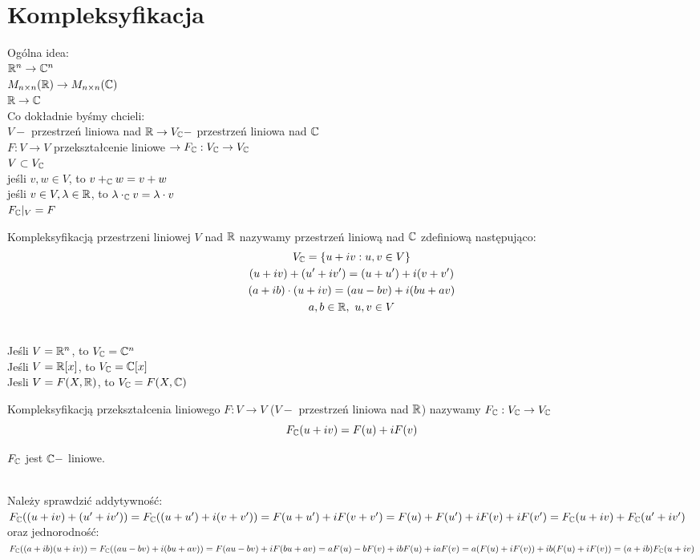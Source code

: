 \section{Kompleksyfikacja} 
Ogólna idea: \\[0.25cm]
$\mathbb{R}^n \to \mathbb{C}^n$ \\ 
$M_{n \times n}(\mathbb{R}) \to M_{n \times n}(\mathbb{C})$\\ 
$\mathbb{R} \to \mathbb{C}$ \\[0.5cm] 
Co dokładnie byśmy chcieli:\\[0.25cm]
$V - $ przestrzeń liniowa nad $\mathbb{R} \to V_{\mathbb{C}} - $ przestrzeń liniowa nad $\mathbb{C}$ \\ 
$F: V \to V $ przekształcenie liniowe $\to F_{\mathbb{C}} : V_{\mathbb{C}} \to V_{\mathbb{C}}$ \\ 
$V \subset V_{\mathbb{C}}$ \\ 
jeśli $v,w \in V$, to $v +_{\mathbb{C}} w = v + w$\\ 
jeśli $v \in V, \lambda \in \mathbb{R}$, to $\lambda \cdot_{\mathbb{C}} v = \lambda \cdot v$ \\ 
$F_{\mathbb{C}} |_V = F$
\begin{df} 
    Kompleksyfikacją przestrzeni liniowej $V$ nad $\mathbb{R}$ nazywamy przestrzeń liniową nad 
    $\mathbb{C}$ zdefiniową następująco: 
    \begin{gather*} 
        V_{\mathbb{C}} = \{ u + iv : u, v \in V \} \\ 
        (u + iv) + (u' + iv') = (u+u') + i(v +v') \\ 
        (a + ib) \cdot (u + iv) = (au - bv) + i(bu + av) \\ 
        a,b \in \mathbb{R},\ u,v \in V
    \end{gather*} 
\end{df} 
\begin{przy} ~\\
    Jeśli $V = \mathbb{R}^n$, to $V_{\mathbb{C}} = \mathbb{C}^n$ \\ 
    Jeśli $V = \mathbb{R}[x]$, to $V_{\mathbb{C}} = \mathbb{C}[x]$ \\ 
    Jesli $V = F(X,\mathbb{R})$, to $V_{\mathbb{C}} = F(X,\mathbb{C})$
\end{przy} 
\begin{df} 
    Kompleksyfikacją przekształcenia liniowego $F: V \to V$ ($V - $ przestrzeń liniowa nad 
    $\mathbb{R}$) nazywamy $F_{\mathbb{C}}: V_{\mathbb{C}} \to V_{\mathbb{C}}$
    \[ F_{\mathbb{C}} (u+iv) = F(u) + iF(v) \]
\end{df} 
\begin{ft} 
    $F_{\mathbb{C}}$ jest $\mathbb{C} - $ liniowe. 
\end{ft} 
\begin{dd} ~\\ 
    Należy sprawdzić addytywność: \\
    $F_{\mathbb{C}} ((u+iv) + (u'+iv')) = F_{\mathbb{C}}((u+u')+i(v+v')) = F(u+u') + iF(v+v') = 
    F(u) + F(u') + iF(v) + iF(v') = F_{\mathbb{C}} (u+iv) + F_{\mathbb{C}}(u' + iv')$ \\ 
    oraz jednorodność:  \\
    $F_{\mathbb{C}} ((a+ib)(u+iv)) = F_{\mathbb{C}} ((au-bv)+i(bu+av)) = F(au-bv)+iF(bu+av) = aF(u) - bF(v) 
    + ibF(u) + iaF(v) = a(F(u)+iF(v)) + ib(F(u)+iF(v)) = (a+ib) F_{\mathbb{C}} (u+iv)$
\end{dd} 
